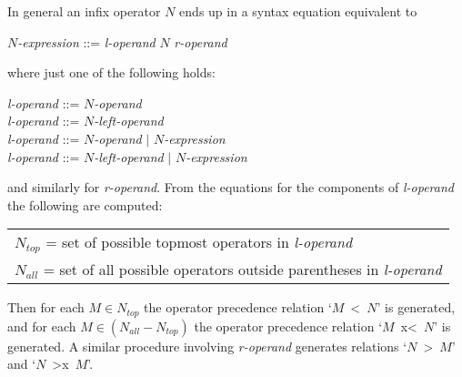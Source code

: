 \documentclass[12pt]{article}
\begin{document}
In general an infix operator $N$ ends up in a syntax equation equivalent to
\begin{center}
{\em $N$-expression} ::= {\em l-operand} $N$ {\em r-operand}
\end{center}
where just one of the following holds:
\begin{center}
{\em l-operand} ::= {\em $N$-operand} \\
{\em l-operand} ::= {\em $N$-left-operand} \\
{\em l-operand} ::= {\em $N$-operand} $|$ {\em $N$-expression } \\
{\em l-operand} ::= {\em $N$-left-operand} $|$ {\em $N$-expression }
\end{center}
and similarly for {\em r-operand}.
From the equations for the components of {\em l-operand} the following
are computed:
\begin{center}
\begin{tabular}{l}
$N_{top}$ = set of possible topmost operators in {\em l-operand} \\
$N_{all}$ = set of all possible operators outside parentheses
           in {\em l-operand}
\end{tabular}
\end{center}

Then for each $M\in{}N_{top}$ the operator precedence relation
`$M$~<~$N$' is generated, and for each $M\in(N_{all}-N_{top})$
the operator precedence relation
`$M$~x<~$N$' is generated.  A similar procedure involving {\em r-operand}
generates relations `$N$~>~$M$' and `$N$~>x~$M$'.
\end{document}
